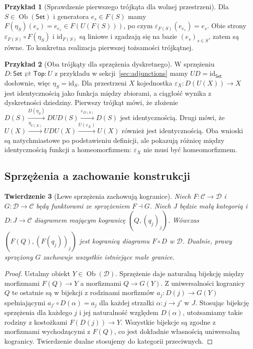 \documentclass[11pt,a4paper]{article}
\numberwithin{equation}{section}
\theoremstyle{plain}
\newtheorem{twierdzenie}{Twierdzenie}[section]
\theoremstyle{definition}
\newtheorem{przyklad}[twierdzenie]{Przykład}
\theoremstyle{remark}
\newcommand{\cat}[1]{\mathsf{#1}}
\newcommand{\Set}{\cat{Set}}
\newcommand{\Top}{\cat{Top}}
\newcommand{\id}{\mathrm{id}}
\newcommand{\Ob}{\operatorname{Ob}}
\begin{document}
\begin{przyklad}[Sprawdzenie pierwszego trójkąta dla wolnej przestrzeni]
Dla $S\in\Ob(\Set)$ i generatora $e_s\in F(S)$ mamy $F(\eta_S)(e_s)=e_{e_s}\in F(U(F(S)))$, po czym $\varepsilon_{F(S)}(e_{e_s})=e_s$. Obie strony $\varepsilon_{F(S)}\circ F(\eta_S)$ i $\id_{F(S)}$ są liniowe i zgadzają się na bazie $(e_s)_{s\in S}$, zatem są równe. To konkretna realizacja pierwszej tożsamości trójkątnej.
\end{przyklad}


\begin{przyklad}[Oba trójkąty dla sprzężenia dyskretnego]
W sprzężeniu $D:\Set\rightleftarrows\Top:U$ z przykładu w sekcji~\ref{sec:adjunctions} mamy $UD=\id_{\Set}$ dosłownie, więc $\eta_S=\id_S$. Dla przestrzeni $X$ kojednostka $\varepsilon_X:D(U(X))\to X$ jest identycznością jako funkcja między zbiorami, a ciągłość wynika z dyskretności dziedziny. Pierwszy trójkąt mówi, że złożenie $D(S)\xrightarrow{D(\eta_S)}DUD(S)\xrightarrow{\varepsilon_{D(S)}}D(S)$ jest identycznością. Drugi mówi, że $U(X)\xrightarrow{\eta_{U(X)}}UDU(X)\xrightarrow{U(\varepsilon_X)}U(X)$ również jest identycznością. Oba wnioski są natychmiastowe po podstawieniu definicji, ale pokazują różnicę między identycznością funkcji a homeomorfizmem: $\varepsilon_X$ nie musi być homeomorfizmem.
\end{przyklad}


\subsection{Sprzężenia a zachowanie konstrukcji}

\begin{twierdzenie}[Lewe sprzężenia zachowują kogranice]\label{tw:adjoints-preserve}
Niech $F:\mathcal C\to\mathcal D$ i $G:\mathcal D\to\mathcal C$ będą funktorami ze sprzężeniem $F\dashv G$. Niech $J$ będzie małą kategorią i $D:J\to\mathcal C$ diagramem mającym kogranicę $(Q,(q_j)_j)$. Wówczas $(F(Q),(F(q_j))_j)$ jest kogranicą diagramu $F\circ D$ w $\mathcal D$. Dualnie, prawy sprzężony $G$ zachowuje wszystkie istniejące małe granice.
\end{twierdzenie}
\begin{proof}
Ustalmy obiekt $Y\in\Ob(\mathcal D)$. Sprzężenie daje naturalną bijekcję między morfizmami $F(Q)\to Y$ a morfizmami $Q\to G(Y)$. Z uniwersalności kogranicy $Q$ te ostatnie są w bijekcji z rodzinami morfizmów $a_j:D(j)\to G(Y)$ spełniającymi $a_{j'}\circ D(\alpha)=a_j$ dla każdej strzałki $\alpha:j\to j'$ w $J$. Stosując bijekcję sprzężenia dla każdego $j$ i jej naturalność względem $D(\alpha)$, utożsamiamy takie rodziny z kostożkami $F(D(j))\to Y$. Wszystkie bijekcje są zgodne z morfizmami wychodzącymi z $F(Q)$, co jest dokładnie własnością uniwersalną kogranicy. Twierdzenie dualne stosujemy do kategorii przeciwnych.
\end{proof}
\end{document}
